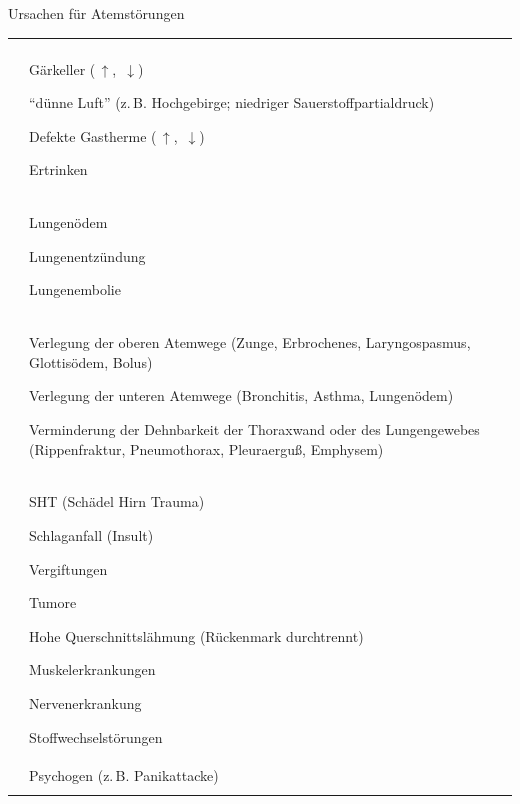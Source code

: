 \TableWide
{Ursachen für
Atemstörungen}%
{}%
{\label{tab:atemstoerungen-ursachen}}%
{}%
{}%
{%
\begin{tabulary}{\linewidth}[H]{LL}\addlinespace\toprule\addlinespace
\noindent{}  &
\noindent{}
\\\addlinespace\midrule\addlinespace
\noindent{}
 &
Gärkeller (\,${\uparrow}$, \,${\downarrow}$)

\enquote{dünne Luft} (z.\,B. Hochgebirge;
niedriger Sauerstoffpartialdruck)

Defekte Gastherme (\,${\uparrow}$,
\,${\downarrow}$)

Ertrinken
\\\addlinespace
\noindent{}
 &
Lungenödem

Lungenentzündung

Lungenembolie
\\\addlinespace
\noindent{}
 &
Verlegung der oberen Atemwege (Zunge, Erbrochenes, Laryngospasmus,
         Glottisödem, Bolus)

Verlegung der unteren Atemwege (Bronchitis, Asthma,
Lungenödem)

Verminderung der Dehnbarkeit der Thoraxwand oder des Lungengewebes
     (Rippenfraktur, Pneumothorax, Pleuraerguß, Emphysem)
\\\addlinespace
\noindent{}
 &
SHT (Schädel Hirn Trauma)

Schlaganfall (Insult)

Vergiftungen

Tumore

Hohe Querschnittslähmung (Rückenmark durchtrennt)

Muskelerkrankungen

Nervenerkrankung

Stoffwechselstörungen
\\\addlinespace
\noindent{}
 &
 Psychogen (z.\,B. Panikattacke)
\\\addlinespace\bottomrule
\end{tabulary}
}%
{}%

